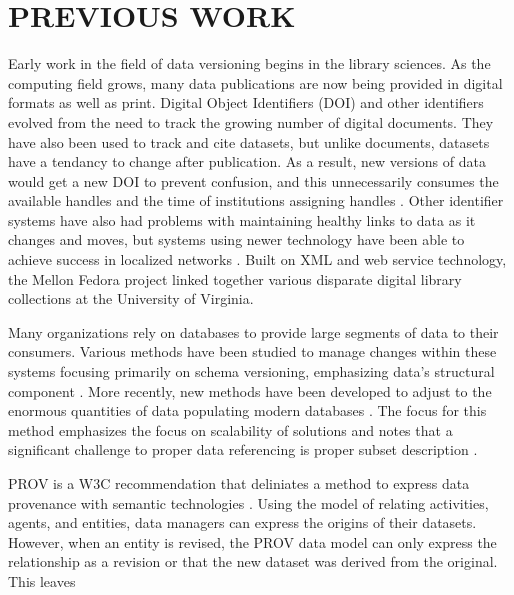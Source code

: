 
\chapter{PREVIOUS WORK}
Early work in the field of data versioning begins in the library sciences.
As the computing field grows, many data publications are now being provided in digital formats as well as print.
Digital Object Identifiers (DOI) and other identifiers evolved from the need to track the growing number of digital documents.
They have also been used to track and cite datasets, but unlike documents, datasets have a tendancy to change after publication.
As a result, new versions of data would get a new DOI to prevent confusion, and this unnecessarily consumes the available handles and the time of institutions assigning handles \cite{Lyons2005}.
Other identifier systems have also had problems with maintaining healthy links to data as it changes and moves, but systems using newer technology have been able to achieve success in localized networks \cite{Payette2002}.
Built on XML and web service technology, the Mellon Fedora project linked together various disparate digital library collections at the University of Virginia.

Many organizations rely on databases to provide large segments of data to their consumers.
Various methods have been studied to manage changes within these systems focusing primarily on schema versioning, emphasizing data's structural component \cite{roddick1996model}.
More recently, new methods have been developed to adjust to the enormous quantities of data populating modern databases \cite{Proell2013} \cite{DBLP:conf/data/2013}.
The focus for this method emphasizes the focus on scalability of solutions and notes that a significant challenge to proper data referencing is proper subset description \cite{proellBigData}.


PROV is a W3C recommendation that deliniates a method to express data provenance with semantic technologies \cite{Belhajjame2013}.
Using the model of relating activities, agents, and entities, data managers can express the origins of their datasets.
However, when an entity is revised, the PROV data model can only express the relationship as a revision or that the new dataset was derived from the original.
This leaves



